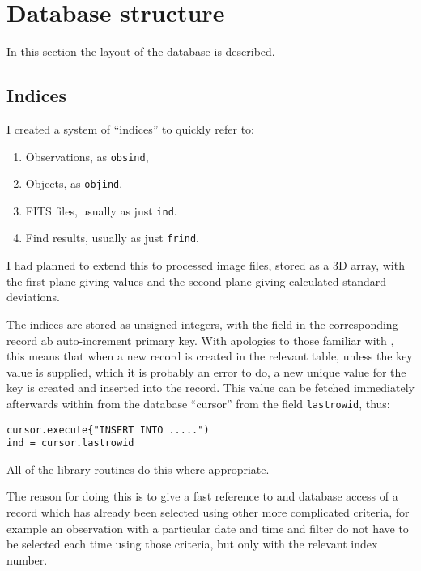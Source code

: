 \section{Database structure}
\protect\label{section:databasestruct}

In this section the layout of the database is described.

\subsection{Indices}
\protect\label{section:indices}

I created a system of ``indices'' to quickly refer to:

\begin{enumerate}
  \item Observations, as \texttt{obsind},
  \item Objects, as \texttt{objind}.
  \item FITS files, usually as just \texttt{ind}.
  \item Find results, usually as just \texttt{frind}.
\end{enumerate}

I had planned to extend this to processed image files, stored as a {\numpy} 3D
array, with the first plane giving values and the second plane giving calculated
standard deviations.

The indices are stored as {\mysql} unsigned integers, with the field in the
corresponding record ab auto-increment primary key. With apologies to those
familiar with \mysql, this means that when a new record is created in the
relevant table, unless the key value is supplied, which it is probably an error
to do, a new unique value for the key is created and inserted into the record.
This value can be fetched immediately afterwards within {\py} from the database
``cursor'' from the field \texttt{lastrowid}, thus:

\begin{verbatim}
cursor.execute{"INSERT INTO .....")
ind = cursor.lastrowid
\end{verbatim}

All of the library routines do this where appropriate.

The reason for doing this is to give a fast reference to and database access of
a record which has already been selected using other more complicated criteria,
for example an observation with a particular date and time and filter do not have
to be selected each time using those criteria, but only with the relevant index
number.

